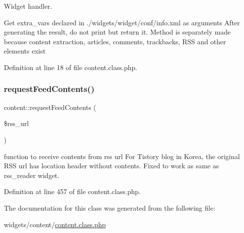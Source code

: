 Widget handler. 

Get extra\+\_\+vars declared in ./widgets/widget/conf/info.xml as arguments After generating the result, do not print but return it. Method is separately made because content extraction, articles, comments, trackbacks, R\+SS and other elements exist

Definition at line 18 of file content.\+class.\+php.

\mbox{\label{classcontent_a6f9991d17df1b915196ca159512552a1}} 
\subsubsection{\texorpdfstring{request\+Feed\+Contents()}{requestFeedContents()}}
{\footnotesize\ttfamily content\+::request\+Feed\+Contents (\begin{DoxyParamCaption}\item[{}]{\$rss\+\_\+url }\end{DoxyParamCaption})}



function to receive contents from rss url For Tistory blog in Korea, the original R\+SS url has location header without contents. Fixed to work as same as rss\+\_\+reader widget. 



Definition at line 457 of file content.\+class.\+php.



The documentation for this class was generated from the following file\+:\begin{DoxyCompactItemize}
\item 
widgets/content/\hyperlink{content_8class_8php}{content.\+class.\+php}\end{DoxyCompactItemize}
